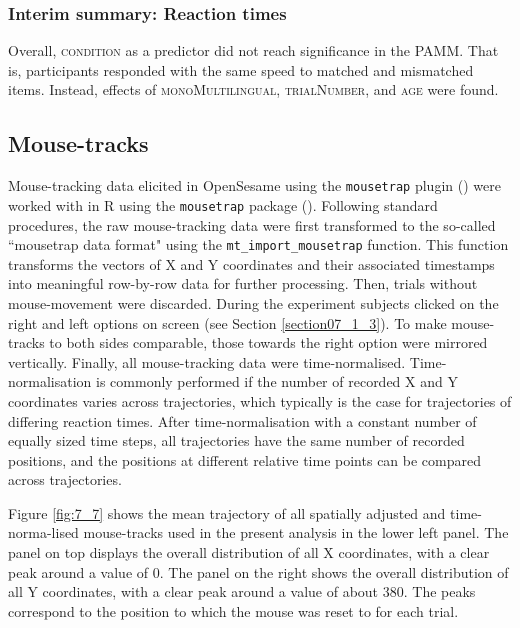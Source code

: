 \subsubsection{Interim summary: Reaction times}\label{section07_2_2_4}

Overall, \textsc{condition} as a predictor did not reach significance in the PAMM. That is, participants responded with the same speed to matched and mismatched items. Instead, effects of \textsc{monoMultilingual}, \textsc{trialNumber}, and \textsc{age} were found.

\subsection{Mouse-tracks}\label{section07_2_3}

Mouse-tracking data elicited in OpenSesame using the \texttt{mousetrap} plugin (\cite{Kieslich2017}) were worked with in R using the \texttt{mousetrap} package (\cite{Kieslich2019}). Following standard procedures, the raw mouse-tracking data were first transformed to the so-called ``mousetrap data format" using the \texttt{mt\_import\_mousetrap} function. This function transforms the vectors of X and Y coordinates and their associated timestamps into meaningful row-by-row data for further processing. Then, trials without mouse-movement were discarded. During the experiment subjects clicked on the right and left options on screen (see Section \ref{section07_1_3}). To make mouse-tracks to both sides comparable, those towards the right option were mirrored vertically. Finally, all mouse-tracking data were time-normalised. Time-normalisation is commonly performed if the number of recorded X and Y coordinates varies across trajectories, which typically is the case for trajectories of differing reaction times. After time-normalisation with a constant number of equally sized time steps, all trajectories have the same number of recorded positions, and the positions at different relative time points can be compared across trajectories. 

Figure \ref{fig:7_7} shows the mean trajectory of all spatially adjusted and time-norma-lised mouse-tracks used in the present analysis in the lower left panel. The panel on top displays the overall distribution of all X coordinates, with a clear peak around a value of $0$. The panel on the right shows the overall distribution of all Y coordinates, with a clear peak around a value of about $380$. The peaks correspond to the position to which the mouse was reset to for each trial.

